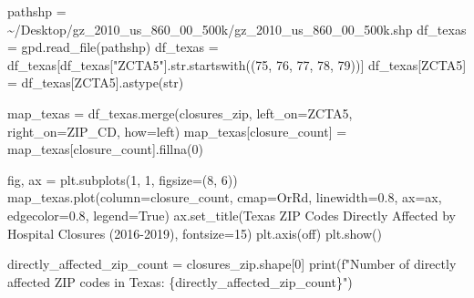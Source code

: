 \documentclass[
  letterpaper,
  DIV=11,
  numbers=noendperiod]{scrartcl}
\newenvironment{Shaded}{\begin{snugshade}}{\end{snugshade}}
\newcommand{\BuiltInTok}[1]{\textcolor[rgb]{0.00,0.23,0.31}{#1}}
\newcommand{\DecValTok}[1]{\textcolor[rgb]{0.68,0.00,0.00}{#1}}
\newcommand{\FloatTok}[1]{\textcolor[rgb]{0.68,0.00,0.00}{#1}}
\newcommand{\NormalTok}[1]{\textcolor[rgb]{0.00,0.23,0.31}{#1}}
\newcommand{\OperatorTok}[1]{\textcolor[rgb]{0.37,0.37,0.37}{#1}}
\newcommand{\SpecialCharTok}[1]{\textcolor[rgb]{0.37,0.37,0.37}{#1}}
\newcommand{\SpecialStringTok}[1]{\textcolor[rgb]{0.13,0.47,0.30}{#1}}
\newcommand{\StringTok}[1]{\textcolor[rgb]{0.13,0.47,0.30}{#1}}
\newcommand{\VariableTok}[1]{\textcolor[rgb]{0.07,0.07,0.07}{#1}}
\begin{document}
\begin{Shaded}
\begin{Highlighting}[]
\NormalTok{pathshp }\OperatorTok{=} \StringTok{\textquotesingle{}\textasciitilde{}/Desktop/gz\_2010\_us\_860\_00\_500k/gz\_2010\_us\_860\_00\_500k.shp\textquotesingle{}}
\NormalTok{df\_texas }\OperatorTok{=}\NormalTok{ gpd.read\_file(pathshp)}
\NormalTok{df\_texas }\OperatorTok{=}\NormalTok{ df\_texas[df\_texas[}\StringTok{"ZCTA5"}\NormalTok{].}\BuiltInTok{str}\NormalTok{.startswith((}\StringTok{\textquotesingle{}75\textquotesingle{}}\NormalTok{, }\StringTok{\textquotesingle{}76\textquotesingle{}}\NormalTok{, }\StringTok{\textquotesingle{}77\textquotesingle{}}\NormalTok{, }\StringTok{\textquotesingle{}78\textquotesingle{}}\NormalTok{, }\StringTok{\textquotesingle{}79\textquotesingle{}}\NormalTok{))]}
\NormalTok{df\_texas[}\StringTok{\textquotesingle{}ZCTA5\textquotesingle{}}\NormalTok{] }\OperatorTok{=}\NormalTok{ df\_texas[}\StringTok{\textquotesingle{}ZCTA5\textquotesingle{}}\NormalTok{].astype(}\BuiltInTok{str}\NormalTok{)}

\NormalTok{map\_texas }\OperatorTok{=}\NormalTok{ df\_texas.merge(closures\_zip, left\_on}\OperatorTok{=}\StringTok{\textquotesingle{}ZCTA5\textquotesingle{}}\NormalTok{, right\_on}\OperatorTok{=}\StringTok{\textquotesingle{}ZIP\_CD\textquotesingle{}}\NormalTok{, how}\OperatorTok{=}\StringTok{\textquotesingle{}left\textquotesingle{}}\NormalTok{)}
\NormalTok{map\_texas[}\StringTok{\textquotesingle{}closure\_count\textquotesingle{}}\NormalTok{] }\OperatorTok{=}\NormalTok{ map\_texas[}\StringTok{\textquotesingle{}closure\_count\textquotesingle{}}\NormalTok{].fillna(}\DecValTok{0}\NormalTok{)}

\NormalTok{fig, ax }\OperatorTok{=}\NormalTok{ plt.subplots(}\DecValTok{1}\NormalTok{, }\DecValTok{1}\NormalTok{, figsize}\OperatorTok{=}\NormalTok{(}\DecValTok{8}\NormalTok{, }\DecValTok{6}\NormalTok{))}
\NormalTok{map\_texas.plot(column}\OperatorTok{=}\StringTok{\textquotesingle{}closure\_count\textquotesingle{}}\NormalTok{, cmap}\OperatorTok{=}\StringTok{\textquotesingle{}OrRd\textquotesingle{}}\NormalTok{, linewidth}\OperatorTok{=}\FloatTok{0.8}\NormalTok{, ax}\OperatorTok{=}\NormalTok{ax, edgecolor}\OperatorTok{=}\StringTok{\textquotesingle{}0.8\textquotesingle{}}\NormalTok{, legend}\OperatorTok{=}\VariableTok{True}\NormalTok{)}
\NormalTok{ax.set\_title(}\StringTok{\textquotesingle{}Texas ZIP Codes Directly Affected by Hospital Closures (2016{-}2019)\textquotesingle{}}\NormalTok{, fontsize}\OperatorTok{=}\DecValTok{15}\NormalTok{)}
\NormalTok{plt.axis(}\StringTok{\textquotesingle{}off\textquotesingle{}}\NormalTok{)}
\NormalTok{plt.show()}

\NormalTok{directly\_affected\_zip\_count }\OperatorTok{=}\NormalTok{ closures\_zip.shape[}\DecValTok{0}\NormalTok{]}
\BuiltInTok{print}\NormalTok{(}\SpecialStringTok{f"Number of directly affected ZIP codes in Texas: }\SpecialCharTok{\{}\NormalTok{directly\_affected\_zip\_count}\SpecialCharTok{\}}\SpecialStringTok{"}\NormalTok{)}
\end{Highlighting}
\end{Shaded}
\end{document}
